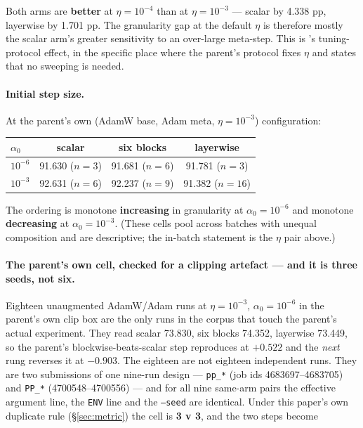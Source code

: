 \documentclass[10pt,letterpaper]{article}
\newcommand{\arm}[1]{\texttt{#1}}
\begin{document}
Both arms are \textbf{better} at $\eta = 10^{-4}$ than at $\eta = 10^{-3}$ --- scalar by 4.338
pp, layerwise by 1.701 pp. The granularity gap at the default $\eta$ is therefore mostly the
scalar arm's greater sensitivity to an over-large meta-step. This is
\citeauthor{choi2020empirical}'s tuning-protocol effect, in the specific place where the
parent's protocol fixes $\eta$ and states that no sweeping is needed.

\paragraph{Initial step size.}
At the parent's own (AdamW base, Adam meta, $\eta = 10^{-3}$) configuration:

\begin{center}
\small
\begin{tabular}{@{}lccc@{}}
\toprule
$\alpha_0$ & scalar & six blocks & layerwise \\
\midrule
$10^{-6}$ & 91.630 ($n{=}3$) & 91.681 ($n{=}6$) & 91.781 ($n{=}3$) \\
$10^{-3}$ & 92.631 ($n{=}6$) & 92.237 ($n{=}9$) & 91.382 ($n{=}16$) \\
\bottomrule
\end{tabular}
\end{center}

The ordering is monotone \textbf{increasing} in granularity at $\alpha_0 = 10^{-6}$ and monotone
\textbf{decreasing} at $\alpha_0 = 10^{-3}$. (These cells pool across batches with unequal
composition and are descriptive; the in-batch statement is the $\eta$ pair above.)

\paragraph{The parent's own cell, checked for a clipping artefact --- and it is three seeds, not
six.}
Eighteen unaugmented AdamW/Adam runs at $\eta = 10^{-3}$, $\alpha_0 = 10^{-6}$ in the parent's own
clip box are the only runs in the corpus that touch the parent's actual experiment. They read
scalar 73.830, six blocks 74.352, layerwise 73.449, so the parent's blockwise-beats-scalar step
reproduces at $\mathbf{+0.522}$ and the \emph{next} rung reverses it at $\mathbf{-0.903}$. The
eighteen are not eighteen independent runs. They are two submissions of one nine-run design ---
\arm{pp\_*} (job ids 4683697--4683705) and \arm{PP\_*} (4700548--4700556) --- and for all nine
same-arm pairs the effective argument line, the \texttt{ENV} line and the \texttt{--seed} are
identical. Under this paper's own duplicate rule (\S\ref{sec:metric}) the cell is \textbf{3 v 3},
and the two steps become
\end{document}
